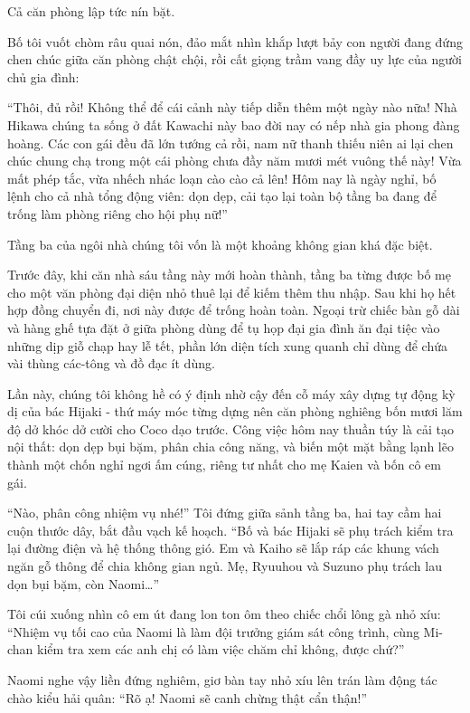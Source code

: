 \documentclass[../main.tex]{subfiles}
\begin{document}
Cả căn phòng lập tức nín bặt.

Bố tôi vuốt chòm râu quai nón, đảo mắt nhìn khắp lượt bảy con người đang đứng chen chúc giữa căn phòng chật chội, rồi cất giọng trầm vang đầy uy lực của người chủ gia đình:

``Thôi, đủ rồi! Không thể để cái cảnh này tiếp diễn thêm một ngày nào nữa! Nhà Hikawa chúng ta sống ở đất Kawachi này bao đời nay có nếp nhà gia phong đàng hoàng. Các con gái đều đã lớn tướng cả rồi, nam nữ thanh thiếu niên ai lại chen chúc chung chạ trong một cái phòng chưa đầy năm mươi mét vuông thế này! Vừa mất phép tắc, vừa nhếch nhác loạn cào cào cả lên! Hôm nay là ngày nghỉ, bố lệnh cho cả nhà tổng động viên: dọn dẹp, cải tạo lại toàn bộ tầng ba đang để trống làm phòng riêng cho hội phụ nữ!''

\ct

Tầng ba của ngôi nhà chúng tôi vốn là một khoảng không gian khá đặc biệt.

Trước đây, khi căn nhà sáu tầng này mới hoàn thành, tầng ba từng được bố mẹ cho một văn phòng đại diện nhỏ thuê lại để kiếm thêm thu nhập. Sau khi họ hết hợp đồng chuyển đi, nơi này được để trống hoàn toàn. Ngoại trừ chiếc bàn gỗ dài và hàng ghế tựa đặt ở giữa phòng dùng để tụ họp đại gia đình ăn đại tiệc vào những dịp giỗ chạp hay lễ tết, phần lớn diện tích xung quanh chỉ dùng để chứa vài thùng các-tông và đồ đạc ít dùng.

Lần này, chúng tôi không hề có ý định nhờ cậy đến cỗ máy xây dựng tự động kỳ dị của bác Hijaki - thứ máy móc từng dựng nên căn phòng nghiêng bốn mươi lăm độ dở khóc dở cười cho Coco dạo trước. Công việc hôm nay thuần túy là cải tạo nội thất: dọn dẹp bụi bặm, phân chia công năng, và biến một mặt bằng lạnh lẽo thành một chốn nghỉ ngơi ấm cúng, riêng tư nhất cho mẹ Kaien và bốn cô em gái.

``Nào, phân công nhiệm vụ nhé!'' Tôi đứng giữa sảnh tầng ba, hai tay cầm hai cuộn thước dây, bắt đầu vạch kế hoạch. ``Bố và bác Hijaki sẽ phụ trách kiểm tra lại đường điện và hệ thống thông gió. Em và Kaiho sẽ lắp ráp các khung vách ngăn gỗ thông để chia không gian ngủ. Mẹ, Ryuuhou và Suzuno phụ trách lau dọn bụi bặm, còn Naomi\dots''

Tôi cúi xuống nhìn cô em út đang lon ton ôm theo chiếc chổi lông gà nhỏ xíu: ``Nhiệm vụ tối cao của Naomi là làm đội trưởng giám sát công trình, cùng Mi-chan kiểm tra xem các anh chị có làm việc chăm chỉ không, được chứ?''

Naomi nghe vậy liền đứng nghiêm, giơ bàn tay nhỏ xíu lên trán làm động tác chào kiểu hải quân: ``Rõ ạ! Naomi sẽ canh chừng thật cẩn thận!''
\end{document}

